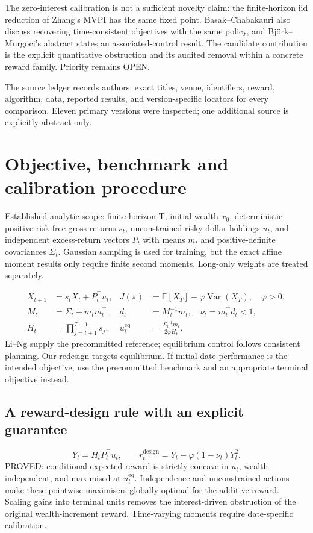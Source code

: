 \documentclass[11pt,a4paper]{article}
\theoremstyle{plain}
\theoremstyle{definition}
\theoremstyle{remark}
\newcommand{\E}{\mathbb{E}}
\newcommand{\Var}{\operatorname{Var}}
\begin{document}
The zero-interest calibration is not a sufficient novelty claim: the finite-horizon iid reduction of Zhang's MVPI has the same fixed point. Basak--Chabakauri also discuss recovering time-consistent objectives with the same policy, and Björk--Murgoci's abstract states an associated-control result. The candidate contribution is the explicit quantitative obstruction and its audited removal within a concrete reward family. Priority remains OPEN. \citep{ref6,ref10,ref12}

The source ledger records authors, exact titles, venue, identifiers, reward, algorithm, data, reported results, and version-specific locators for every comparison. Eleven primary versions were inspected; one additional source is explicitly abstract-only.


\section{Objective, benchmark and calibration procedure}

Established analytic scope: finite horizon T, initial wealth $x_0$, deterministic positive risk-free gross returns $s_t$, unconstrained risky dollar holdings $u_t$, and independent excess-return vectors $P_t$ with means $m_t$ and positive-definite covariances $\Sigma_t$. Gaussian sampling is used for training, but the exact affine moment results only require finite second moments. Long-only weights are treated separately.

\begin{equation}
\begin{aligned}
 X_{t+1}&=s_tX_t+P_t^{\top}u_t,& J(\pi)&=\E[X_T]-\varphi\Var(X_T),\quad\varphi>0,\\
 M_t&=\Sigma_t+m_tm_t^{\top},& d_t&=M_t^{-1}m_t,\quad\nu_t=m_t^{\top}d_t<1,\\
 H_t&=\prod_{j=t+1}^{T-1}s_j,&u_t^{\mathrm{eq}}&=\frac{\Sigma_t^{-1}m_t}{2\varphi H_t}.
 \end{aligned}
\end{equation}
Li--Ng supply the precommitted reference; equilibrium control follows consistent planning. Our redesign targets equilibrium. If initial-date performance is the intended objective, use the precommitted benchmark and an appropriate terminal objective instead. \citep{ref9,ref10,ref7}

\subsection{A reward-design rule with an explicit guarantee}
\begin{equation}
Y_t=H_tP_t^{\top}u_t,\qquad r_t^{\mathrm{design}}=Y_t-\varphi(1-\nu_t)Y_t^2.
\end{equation}
PROVED: conditional expected reward is strictly concave in $u_t$, wealth-independent, and maximised at $u_t^{\mathrm{eq}}$. Independence and unconstrained actions make these pointwise maximisers globally optimal for the additive reward. Scaling gains into terminal units removes the interest-driven obstruction of the original wealth-increment reward. Time-varying moments require date-specific calibration.
\end{document}
